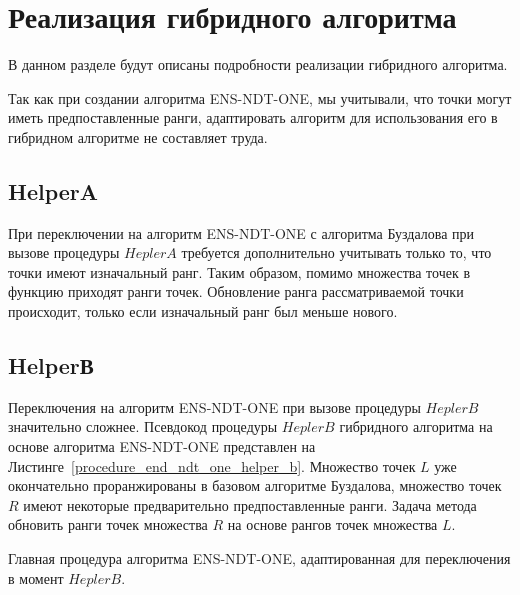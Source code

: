\section{Реализация гибридного алгоритма}

В данном разделе будут описаны подробности реализации гибридного алгоритма.

Так как при создании алгоритма ENS-NDT-ONE, мы учитывали, что точки могут иметь предпоставленные ранги, адаптировать алгоритм для использования его в гибридном алгоритме не составляет труда.

\subsection{HelperA}

При переключении на алгоритм ENS-NDT-ONE с алгоритма Буздалова при вызове процедуры $HeplerA$ требуется дополнительно учитывать только то, что точки имеют изначальный ранг. Таким образом, помимо множества точек в функцию приходят ранги точек. Обновление ранга рассматриваемой точки происходит, только если изначальный ранг был меньше нового.


\subsection{HelperВ}

Переключения на алгоритм ENS-NDT-ONE при вызове процедуры $HeplerB$ значительно сложнее. Псевдокод процедуры $HeplerB$ гибридного алгоритма на основе алгоритма ENS-NDT-ONE представлен на Листинге~\ref{procedure_end_ndt_one_helper_b}. Множество точек $L$ уже окончательно проранжированы в базовом алгоритме Буздалова, множество точек $R$ имеют некоторые предварительно предпоставленные ранги. Задача метода обновить ранги точек множества $R$ на основе рангов точек множества $L$. 

\begin{algorithm}
\begin{algorithmic}[1]
        \EndIf
        \EndIf
    \EndFor
\EndProcedure
\end{algorithmic}
\caption{Главная процедура алгоритма ENS-NDT-ONE, адаптированная для переключения в момент $HeplerB$.}
\label{procedure_end_ndt_one_helper_b}
\end{algorithm}

